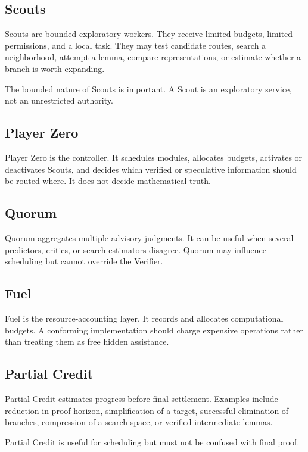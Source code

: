 \documentclass[11pt]{article}
\begin{document}
\subsection{Scouts}

Scouts are bounded exploratory workers. They receive limited budgets, limited permissions, and a local task. They may test candidate routes, search a neighborhood, attempt a lemma, compare representations, or estimate whether a branch is worth expanding.

The bounded nature of Scouts is important. A Scout is an exploratory service, not an unrestricted authority.

\subsection{Player Zero}

Player Zero is the controller. It schedules modules, allocates budgets, activates or deactivates Scouts, and decides which verified or speculative information should be routed where. It does not decide mathematical truth.

\subsection{Quorum}

Quorum aggregates multiple advisory judgments. It can be useful when several predictors, critics, or search estimators disagree. Quorum may influence scheduling but cannot override the Verifier.

\subsection{Fuel}

Fuel is the resource-accounting layer. It records and allocates computational budgets. A conforming implementation should charge expensive operations rather than treating them as free hidden assistance.

\subsection{Partial Credit}

Partial Credit estimates progress before final settlement. Examples include reduction in proof horizon, simplification of a target, successful elimination of branches, compression of a search space, or verified intermediate lemmas.

Partial Credit is useful for scheduling but must not be confused with final proof.
\end{document}
